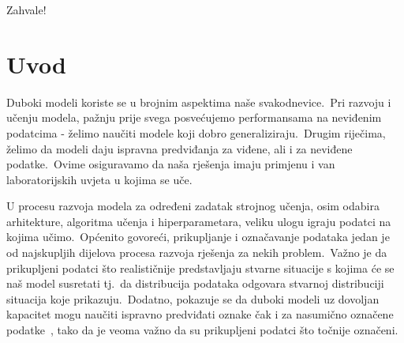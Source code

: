 \documentclass[diplomskirad]{fer}
\author{Dominik Jambrović}
\begin{document}
\maketitle






\begin{zahvale}
  Zahvale!
\end{zahvale}


\mainmatter


\tableofcontents


\chapter{Uvod}
\label{pog:uvod}
  
Duboki modeli koriste se u brojnim aspektima naše svakodnevice.\ Pri razvoju i učenju modela, pažnju prije svega posvećujemo performansama na neviđenim podatcima - želimo naučiti modele koji dobro generaliziraju.\ 
Drugim riječima, želimo da modeli daju ispravna predviđanja za viđene, ali i za neviđene podatke.\ Ovime osiguravamo da naša rješenja imaju primjenu i van laboratorijskih uvjeta u kojima se uče.\
  
U procesu razvoja modela za određeni zadatak strojnog učenja, osim odabira arhitekture, algoritma učenja i hiperparametara, veliku ulogu igraju podatci na kojima učimo.\ 
Općenito govoreći, prikupljanje i označavanje podataka jedan je od najskupljih dijelova procesa razvoja rješenja za nekih problem.\ 
Važno je da prikupljeni podatci što realističnije predstavljaju stvarne situacije s kojima će se naš model susretati tj.\ da distribucija podataka odgovara stvarnoj distribuciji situacija koje prikazuju.\ 
Dodatno, pokazuje se da duboki modeli uz dovoljan kapacitet mogu naučiti ispravno predviđati oznake čak i za nasumično označene podatke~\cite{zhang2016understanding}, tako da je veoma važno da su prikupljeni podatci što točnije označeni.\
  
\end{document}
